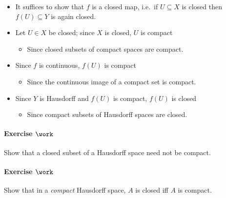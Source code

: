 \begin{solution}

\envlist

\begin{itemize}
\tightlist
\item
  It suffices to show that \(f\) is a closed map, i.e.~if
  \(U\subseteq X\) is closed then \(f(U)\subseteq Y\) is again closed.
\item
  Let \(U\in X\) be closed; since \(X\) is closed, \(U\) is compact

  \begin{itemize}
  \tightlist
  \item
    Since closed subsets of compact spaces are compact.
  \end{itemize}
\item
  Since \(f\) is continuous, \(f(U)\) is compact

  \begin{itemize}
  \tightlist
  \item
    Since the continuous image of a compact set is compact.
  \end{itemize}
\item
  Since \(Y\) is Hausdorff and \(f(U)\) is compact, \(f(U)\) is closed

  \begin{itemize}
  \tightlist
  \item
    Since compact subsets of Hausdorff spaces are closed.
  \end{itemize}
\end{itemize}

\end{solution}

\hypertarget{exercise-work-39}{%
\paragraph{\texorpdfstring{Exercise
\(\work\)}{Exercise \textbackslash work}}\label{exercise-work-39}}

Show that a closed subset of a Hausdorff space need not be compact.

\hypertarget{exercise-work-40}{%
\paragraph{\texorpdfstring{Exercise
\(\work\)}{Exercise \textbackslash work}}\label{exercise-work-40}}

Show that in a \emph{compact} Hausdorff space, \(A\) is closed iff \(A\)
is compact.

